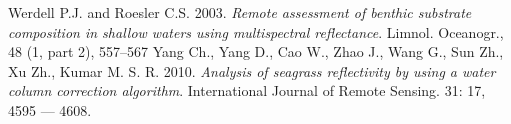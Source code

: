\documentclass[11pt]{article}
\begin{document}
\begin{thebibliography}{999}
Werdell P.J. and Roesler C.S. 2003. \emph{Remote assessment of benthic substrate composition
in shallow waters using multispectral reflectance}. Limnol. Oceanogr., 48 (1, part 2), 557–567 \pageref{Werdell03}
 Yang Ch., Yang D., Cao W., Zhao J., Wang G., Sun Zh., Xu Zh., Kumar M. S. R. 2010. 
\emph{Analysis of seagrass reflectivity by using a water column correction algorithm}. International Journal of Remote Sensing. 31: 17, 4595 — 4608. \pageref{Yang10}

\end{thebibliography}


\newpage
\singlespacing
\printindex[people]
\pagebreak


\cleardoublepage
\newpage
\printindex[concepts]
\end{document}
